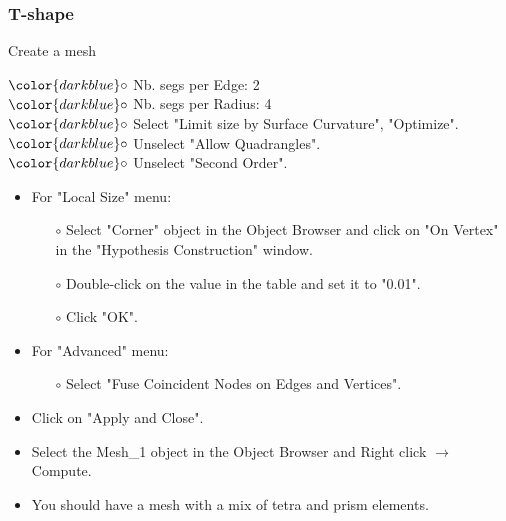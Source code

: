 \documentclass[10pt, hyperref={unicode=true,pdfusetitle, bookmarks=true,bookmarksnumbered=false,bookmarksopen=false, breaklinks=false,pdfborder={0 0 1},backref=true,colorlinks=true,linkcolor=darkblue,pageanchor}]{beamer}
\begin{document}
\begin{frame}
\frametitle{T-shape}
\begin{block}{Create a mesh}

\hspace{1cm} $\color{darkblue}\circ$ {\small{Nb. segs per Edge: 2}}\\
\hspace{1cm} $\color{darkblue}\circ$ {\small{Nb. segs per Radius: 4}}\\
\hspace{1cm} $\color{darkblue}\circ$ {\small{Select "Limit size by Surface Curvature", "Optimize".}}\\
\hspace{1cm} $\color{darkblue}\circ$ {\small{Unselect "Allow Quadrangles".}}\\
\hspace{1cm} $\color{darkblue}\circ$ {\small{Unselect "Second Order".}}\\

\begin{itemize}
\item For "Local Size" menu:
    \begin{itemize}
    \item [$\circ$] Select "Corner" object in the Object Browser and click on "On Vertex" in the "Hypothesis Construction" window.
    \item [$\circ$] Double-click on the value in the table and set it to "0.01".
    \item [$\circ$] Click "OK".
    \end{itemize}
\item For "Advanced" menu:
    \begin{itemize}
    \item [$\circ$] Select "Fuse Coincident Nodes on Edges and Vertices".
    \end{itemize}
\item Click on "Apply and Close".
\item Select the Mesh\_1 object in the Object Browser and Right click $\rightarrow$ Compute.
\item You should have a mesh with a mix of tetra and prism elements.

\end{itemize}

\end{block}
\end{frame}
\end{document}
